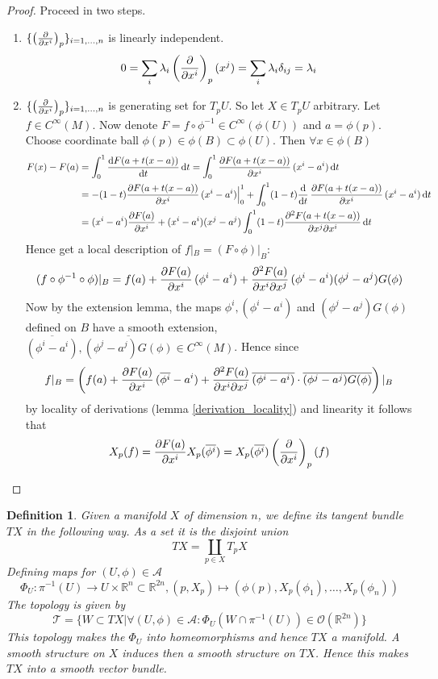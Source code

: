 \documentclass{article}
\numberwithin{theorem}{section}
\newtheorem{definition}[theorem]{Definition}
\renewcommand{\d}[1]{\ensuremath{\operatorname{d}\!{#1}}}
\newcommand{\R}{\mathbb{R}}
\newcommand{\1}{\mathds{1}}
\begin{document}
\begin{proof}
    Proceed in two steps. 
    \begin{enumerate}
        \item $\{ \left( \pdv{}{x^i}\right)_p \}_{i=1, \dots, n }$ is linearly independent. 
        \[ 0 = \sum_i \lambda_i \left( \pdv{}{x^i} \right)_p (x^j) = \sum_i \lambda_i \delta_{ij} = \lambda_i \]
        \item $\{ \left( \pdv{}{x^i}\right)_p \}_{i=1, \dots, n }$  is generating set for $T_pU$. So let $X \in T_pU$ arbitrary. Let $f \in C^\infty(M)$. 
        Now denote $F = f \circ \phi^{-1} \in C^\infty(\phi(U))$ and $a = \phi(p) $. Choose coordinate ball $\phi(p) \in \phi(B) \subset \phi(U)$. Then $\forall x \in \phi(B)$ 
        \begin{align*}
            F(x) - F(a)  &= \int_0^1 \dv{F(a+t(x-a))}{t} \d{t}   = \int_0^1 \pdv{F(a+ t(x-a))}{x^i} \, (x^i - a^i) \d{t}  \\
            &= -(1-t) \pdv{F(a+ t(x-a))}{x^i} \, (x^i - a^i)\Big|^1_0  + \int_0^1 (1-t) \dv{}{t} \, \pdv{F(a+ t(x-a))}{x^i} \, (x^i - a^i) \d{t} \\
            &= (x^i - a^i) \pdv{F(a)}{x^i}(x^i - a^i) + (x^i-a^i)(x^j-a^j) \int_0^1(1-t) \pdv{F(a+t(x-a))}{x^j}{x^i}\d{t} 
        \end{align*}
        Hence get a local description of $f|_B = (F \circ \phi )|_B $: 
        \[ (f\circ \phi^{-1}\circ \phi) |_B =  f(a) + \pdv{F(a)}{x^i} \, ( \phi^i - a^i) +\pdv{F(a)}{x^i}{x^j} \, (\phi^i - a^i)(\phi^j - a^j) G(\phi) \]
        Now by the extension lemma, the maps $\phi^i, (\phi^i - a^i)$ and $(\phi^j - a^j)G(\phi)$ defined on $B$ have a smooth extension, $\overline{(\phi^i - a^i)}, \overline{(\phi^j- a^j) G(\phi)} \in C^\infty(M)$. Hence since 
        \[ f|_B = \left( f(a) + \pdv{F(a)}{x^i} \, ( \overline{\phi^i} - a^i) +\pdv{F(a)}{x^i}{x^j} \, \overline{(\phi^i - a^i)} \cdot \overline{(\phi^j - a^j) G(\phi)} \right)|_B \]
        by locality of derivations (lemma \ref{derivation_locality}) and linearity it follows that 
        \[ X_p(f) = \pdv{F(a)}{x^i} X_p(\overline{\phi^i}) = X_p(\overline{\phi^i}) \left(\pdv{}{x^i}\right)_p (f) \]
    \end{enumerate}
    
\end{proof}

\begin{definition}
    Given a manifold $X$ of dimension $n$, we define its tangent bundle $TX$ in the following way. As a set it is the disjoint union 
    \[ TX = \coprod_{p \in X} T_pX \]
    Defining maps for $(U, \phi) \in \mathscr{A}$
    \[ \Phi_U: \pi^{-1}(U) \to U \times \R^n \subset \R^{2n}, (p, X_p) \mapsto (\phi(p), X_p(\phi_1), \dots, X_p(\phi_n))\]
    The topology is given by 
    \[ \mathcal{T} = \{ W \subset TX | \forall (U, \phi) \in \mathscr{A}: \Phi_U(W \cap \pi^{-1}(U)) \in \mathcal{O}(\R^{2n}) \}\]
    This topology makes the $\Phi_U$ into homeomorphisms and hence $TX$ a manifold. A smooth structure on $X$ induces then a smooth structure on $TX$. Hence this makes $TX$ into a smooth vector bundle. 
\end{definition}
\end{document}
